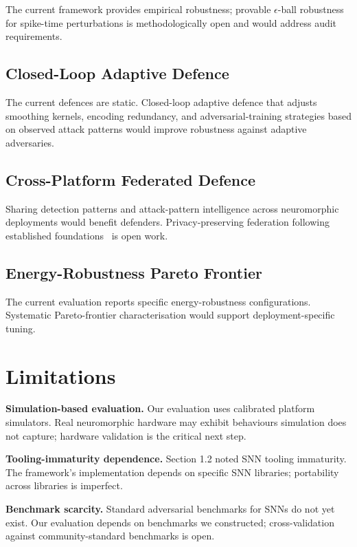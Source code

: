 \documentclass[sigconf,nonacm]{acmart}
\begin{document}
The current framework provides empirical robustness; provable
$\epsilon$-ball robustness for spike-time perturbations is
methodologically open and would address audit requirements.

\subsection{Closed-Loop Adaptive Defence}

The current defences are static. Closed-loop adaptive defence
that adjusts smoothing kernels, encoding redundancy, and
adversarial-training strategies based on observed attack patterns
would improve robustness against adaptive adversaries.

\subsection{Cross-Platform Federated Defence}

Sharing detection patterns and attack-pattern intelligence across
neuromorphic deployments would benefit defenders. Privacy-preserving
federation following established
foundations~\cite{kairouz2024fedml} is open work.

\subsection{Energy-Robustness Pareto Frontier}

The current evaluation reports specific energy-robustness
configurations. Systematic Pareto-frontier characterisation
would support deployment-specific tuning.

\section{Limitations}

\textbf{Simulation-based evaluation.} Our evaluation uses
calibrated platform simulators. Real neuromorphic hardware may
exhibit behaviours simulation does not capture; hardware
validation is the critical next step.

\textbf{Tooling-immaturity dependence.} Section 1.2 noted SNN
tooling immaturity. The framework's implementation depends on
specific SNN libraries; portability across libraries is
imperfect.

\textbf{Benchmark scarcity.} Standard adversarial benchmarks for
SNNs do not yet exist. Our evaluation depends on benchmarks we
constructed; cross-validation against community-standard
benchmarks is open.
\end{document}
